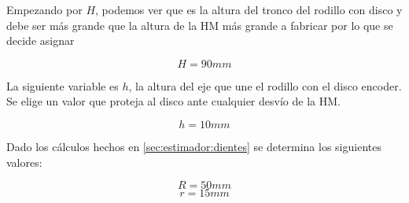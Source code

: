 \documentclass[main_conf.tex]{subfiles}
\begin{document}
Empezando por $H$, podemos ver que es la altura del tronco
del rodillo con disco y debe ser más grande que la altura de la
HM más grande a fabricar por lo que se decide asignar

$$ H = 90 mm $$

La siguiente variable es $h$, la altura del eje que une el
rodillo con el disco encoder. Se elige un valor que proteja
al disco ante cualquier desvío de la HM.

$$ h = 10 mm $$

Dado los cálculos hechos en \ref{sec:estimador:dientes} se
determina los siguientes valores:

$$ R = 50 mm $$
$$ r = 15 mm $$
\end{document}
